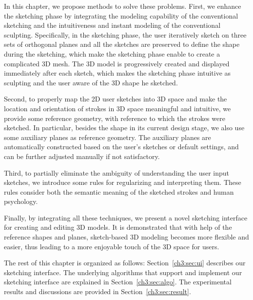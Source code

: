 In this chapter, we propose methods to solve  these problems. First,
we enhance the sketching phase by integrating the
modeling capability of the conventional sketching and the
intuitiveness and instant modeling of the conventional sculpting.
Specifically, in the sketching phase, the user iteratively sketch on
three sets of orthogonal planes and all the sketches are preserved
to define the shape during the sketching, which make the sketching
phase enable to create a complicated  3D mesh. The 3D model is
progressively created and displayed immediately after each sketch,
which makes the sketching phase intuitive as sculpting and the user
aware of the 3D shape he sketched.

Second, to properly map the 2D user sketches into 3D space and
make the location and orientation of strokes in 3D space meaningful
and intuitive, we provide some reference geometry, with reference to
which the strokes were sketched. In particular, besides the shape in
its current design stage, we also use some auxiliary planes as
reference geometry. The auxiliary planes are automatically
constructed based on the user's sketches or default settings, and
can be further adjusted manually if not satisfactory.

Third, to partially eliminate the ambiguity of  understanding the
user input sketches, we introduce some rules for regularizing and
interpreting them. These rules consider both the semantic meaning of
the sketched strokes and human psychology.

Finally, by integrating all these techniques, we present a novel
sketching interface for creating and editing 3D models. It is
demonstrated that with help of the reference shapes and planes,
sketch-based 3D modeling becomes more flexible and easier, thus
leading to a more enjoyable touch of the 3D space for users.

The rest of this chapter is organized as follows:
Section~\ref{ch3:sec:ui} describes our sketching interface. The
underlying algorithms that support and implement our sketching
interface are explained in Section~\ref{ch3:sec:algo}. The
experimental results and discussions are provided in
Section~\ref{ch3:sec:result}.

